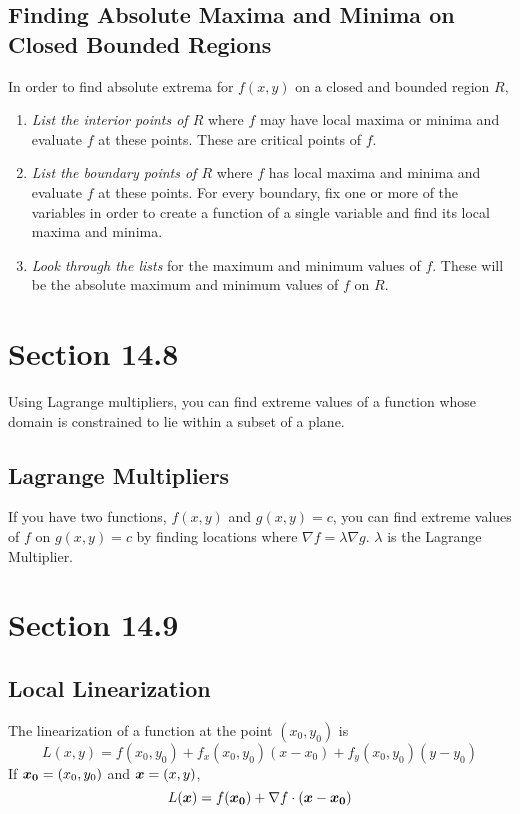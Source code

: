 \documentclass[../main.tex]{subfiles}
\begin{document}
\subsection{Finding Absolute Maxima and Minima on Closed Bounded Regions}
In order to find absolute extrema for $f(x,y)$ on a closed and bounded region $R$, 
\begin{enumerate}
\item \textit{List the interior points of $R$} where $f$ may have local maxima or minima and 
	evaluate $f$ at these points. These are critical points of $f$.
\item \textit{List the boundary points of $R$} where $f$ has local maxima and minima and evaluate 
	$f$ at these points. For every boundary, fix one or more of the variables in order to create a
	function of a single variable and find its local maxima and minima. 
\item \textit{Look through the lists} for the maximum and minimum values of $f$. These will be the
	absolute maximum and minimum values of $f$ on $R$.
\end{enumerate}

\section{Section 14.8}
Using Lagrange multipliers, you can find extreme values of a function whose domain is constrained to
lie within a subset of a plane.

\subsection{Lagrange Multipliers}
If you have two functions, $f(x,y)$ and $g(x,y) = c$, you can find extreme values of $f$ on $g(x,y) = c$ by finding
locations where $\nabla f = \lambda \nabla g$. $\lambda$ is the Lagrange Multiplier. 

\section{Section 14.9}

\subsection{Local Linearization}
The linearization of a function at the point $(x_0, y_0)$ is 
\begin{equation*}
	L(x,y) = f(x_0, y_0) + f_x(x_0, y_0)(x - x_0) + f_y(x_0, y_0)(y - y_0)
\end{equation*}
If $\boldsymbol{x_0} = (x_0, y_0)$ and $\boldsymbol{x} = (x,y)$,
\begin{equation*}
	L(\boldsymbol{x}) = f(\boldsymbol{x_0}) + \nabla f \cdot (\boldsymbol{x} - \boldsymbol{x_0})
\end{equation*}
\end{document}
